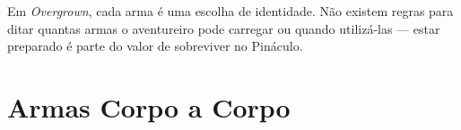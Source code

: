 

Em \textit{Overgrown}, cada arma é uma escolha de identidade. Não existem regras para ditar quantas armas o aventureiro pode carregar ou quando utilizá-las — estar preparado é parte do valor de sobreviver no Pináculo.

\section*{Armas Corpo a Corpo}

\vspace{4pt}
\renewcommand{\arraystretch}{1.45}
\setlength{\tabcolsep}{6pt}
\noindent
